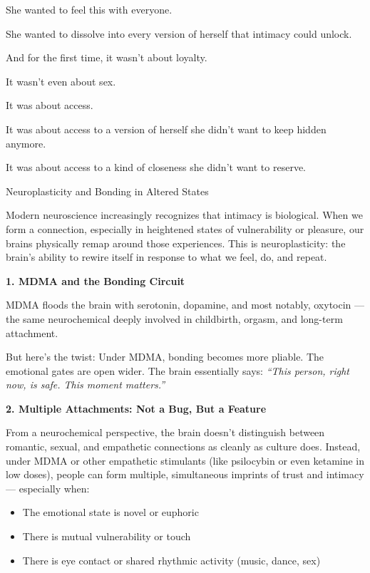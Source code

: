 She wanted to feel this with everyone.

She wanted to dissolve into every version of herself that intimacy could unlock.

And for the first time, it wasn’t about loyalty.

It wasn’t even about sex.

It was about access.

It was about access to a version of herself she didn’t want to keep hidden anymore.

It was about access to a kind of closeness she didn’t want to reserve.
  
\medskip

\begin{TechnicalSidebar}{Neuroplasticity and Bonding in Altered States}

  Modern neuroscience increasingly recognizes that intimacy is  biological.
  When we form a connection, especially in heightened states of vulnerability or pleasure, 
  our brains physically remap around those experiences. This is neuroplasticity: the brain’s 
  ability to rewire itself in response to what we feel, do, and repeat.
  
  \medskip
  
  \textbf{1. MDMA and the Bonding Circuit}
  
  MDMA floods the brain with serotonin, dopamine, and most notably, oxytocin — the same neurochemical 
  deeply involved in childbirth, orgasm, and long-term attachment.

  \medskip
  
  
  But here’s the twist:
  Under MDMA, bonding becomes more pliable. The emotional gates are open wider.
  The brain essentially says:
  \textit{“This person, right now, is safe. This moment matters.”}
  
  \medskip
  
  \textbf{2. Multiple Attachments: Not a Bug, But a Feature}

  \medskip
  
  
  From a neurochemical perspective, the brain doesn’t distinguish between romantic, sexual, and empathetic 
  connections as cleanly as culture does.
  Instead, under MDMA or other empathetic stimulants (like psilocybin or even ketamine in low doses), 
  people can form multiple, simultaneous imprints of trust and intimacy — especially when:

  \medskip
  
  
  \begin{itemize}
    \item The emotional state is novel or euphoric
    \item There is mutual vulnerability or touch
    \item There is eye contact or shared rhythmic activity (music, dance, sex)
  \end{itemize}


\end{TechnicalSidebar}
